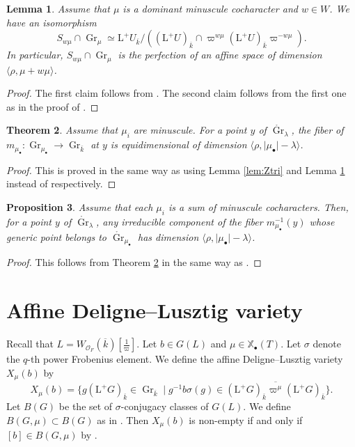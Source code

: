 \documentclass[12pt,a4paper]{article}
\newtheorem{thm}{Theorem}[section]
\newtheorem{prop}[thm]{Proposition}
\newtheorem{lem}[thm]{Lemma}
\DeclareMathOperator{\Gr}{Gr}
\newcommand{\bX}{\mathbb{X}}
\newcommand{\cO}{\mathcal{O}}
\newcommand{\rL}{\mathrm{L}}
\newcommand{\ol}{\overline}
\begin{document}
\begin{lem}\label{lem:SGrA}
Assume that $\mu$ is a dominant minuscule cocharacter and $w \in W$. 
We have an isomorphism 
\[
 S_{w\mu} \cap \Gr_{\mu} \simeq {\rL^+U}_{\ol{k}}/((\rL^+U)_{\ol{k}} \cap \varpi^{w\mu} (\rL^+U)_{\ol{k}}  \varpi^{-w\mu}) . 
\]
In particular, 
$S_{w\mu} \cap \Gr_{\mu}$ is the perfection of an affine space 
of dimension $\langle \rho, \mu +w \mu \rangle$. 
\end{lem}
\begin{proof}
The first claim follows from 
\cite[(3.2.3)]{XiZhCycSh}. 
The second claim follows from the first one as in the proof of 
\cite[Lemma 3.2]{HaiEquconv}. 
\end{proof}

\begin{thm}\label{thm:edmin}
Assume that $\mu_i$ are minuscule. 
For a point $y$ of $\mathring{\Gr}_{\lambda}$, 
the fiber of 
$m_{\mu_{\bullet}} \colon \Gr_{\mu_{\bullet}} \to \Gr_{\ol{k}}$ 
at $y$ is equidimensional of dimension $\langle \rho,\lvert \mu_{\bullet} \rvert -\lambda \rangle$. 
\end{thm}
\begin{proof}
This is proved in the same way as \cite[Theorem 3.1]{HaiEquconv} 
using Lemma \ref{lem:Ztri} and Lemma \ref{lem:SGrA} instead of 
\cite[Lemma 2.1 and Lemma 3.2]{HaiEquconv} respectively. 
\end{proof}


\begin{prop}\label{prop:edsumm}
Assume that each $\mu_i$ is a sum of minuscule cocharacters. 
Then, for a point $y$ of $\mathring{\Gr}_{\lambda}$, 
any irreducible component of the fiber 
$m_{\mu_{\bullet}}^{-1}(y)$ 
whose generic point belongs to 
$\mathring{\Gr}_{\mu_{\bullet}}$ 
has dimension $\langle \rho,\lvert \mu_{\bullet} \rvert -\lambda \rangle$. 
\end{prop}
\begin{proof}
This follows from Theorem \ref{thm:edmin} 
in the same way as \cite[Proposition 4.1]{HaiEquconv}. 
\end{proof}

\section{Affine Deligne--Lusztig variety}\label{sec:AffDL}
Recall that $L=W_{\cO_F}(\ol{k})[\frac{1}{\varpi}]$. 
Let $b \in G(L)$ and $\mu \in \bX_{\bullet}(T)$.  
Let $\sigma$ denote the $q$-th power Frobenius element. 
We define the affine Deligne--Lusztig variety $X_{\mu}(b)$ 
by 
\[
 X_{\mu}(b) = \{ g (\rL^+G)_{\ol{k}}  \in \Gr_{\ol{k}} \mid g^{-1} b \sigma (g) \in \overline{ (\rL^+ G)_{\ol{k}} \varpi^{\mu} (\rL^+ G)_{\ol{k}} } \}. 
\]
Let $B(G)$ be the set of $\sigma$-conjugacy classes of $G(L)$. 
We define $B(G,\mu) \subset B(G)$ as in 
\cite[6.2]{KotIsoII}. 
Then $X_{\mu}(b)$ is non-empty if and only if 
$[b] \in B(G,\mu)$ by \cite[Theorem 5.1]{GasConjKR}. 
\end{document}
